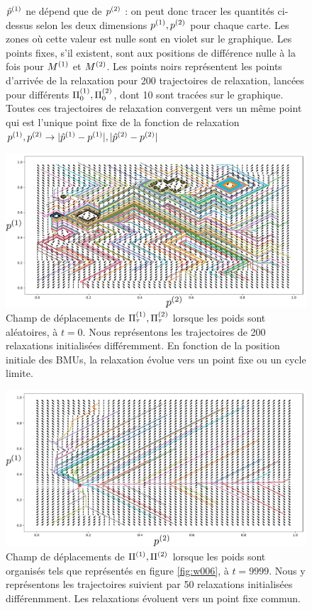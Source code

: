 \documentclass[../main]{subfiles}
\begin{document}
\begin{figure}
{${\hat{p}}^{({1})}$ ne dépend que de $p^{({2})}$ : on peut donc tracer les quantités ci-dessus selon les deux dimensions $p^{({1})}, p^{({2})}$ pour chaque carte. Les zones où cette valeur est nulle sont en violet sur le graphique. Les points fixes, s'il existent, sont aux positions de différence nulle à la fois pour $M^{({1})}$ et $M^{({2})}$. Les points noirs représentent les points d'arrivée de la relaxation pour 200 trajectoires de relaxation, lancées pour différents $\Pi_0^{({1})}, \Pi_0^{({2})}$, dont 10 sont tracées sur le graphique. Toutes ces trajectoires de relaxation convergent vers un même point qui est l'unique point fixe de la fonction de relaxation $p^{({1})}, p^{({2})} \rightarrow \lvert{\hat{p}}^{({1})} - p^{({1})}\rvert, \lvert{\hat{p}}^{({2})} - p^{({2})}\rvert$
\label{fig:diff_relax_notraj}}
\end{figure}

\begin{figure}
\centering
\includegraphics[width=\textwidth]{champ_006_t1.pdf}
\caption{Champ de déplacements de $\Pi^{({1})}_\tau,\Pi^{({2})}_\tau$ lorsque les poids sont aléatoires, à $t=0$. Nous représentons les trajectoires de 200 relaxations initialisées différemment. En fonction de la position initiale des BMUs, la relaxation évolue vers un point fixe ou un cycle limite.}
\label{fig:champ_0}
\end{figure}


\begin{figure}
\centering
\includegraphics[width=\textwidth]{champ_006.pdf}
\caption{Champ de déplacements de $\Pi^{({1})},\Pi^{({2})}$ lorsque les poids sont organisés tels que représentés en figure \ref{fig:w006}, à $t=9999$. Nous y représentons les trajectoires suivient par 50 relaxations initialisées différenmment. Les relaxations évoluent vers un point fixe commun. }
\label{fig:champ_9999}
\end{figure}
\end{document}
